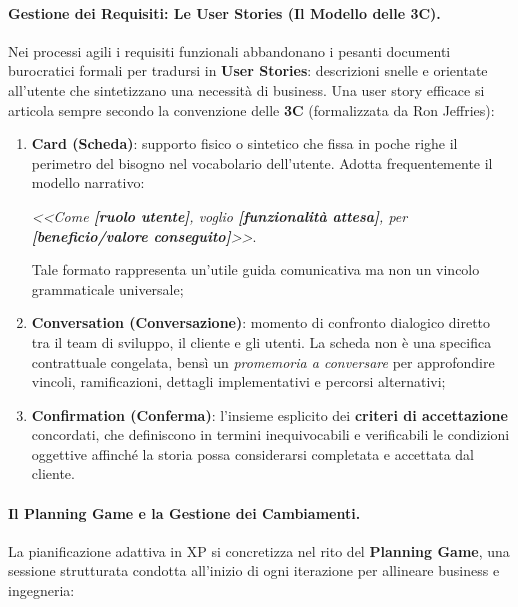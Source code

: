 \documentclass[12pt]{extarticle}
\begin{document}
\paragraph{Gestione dei Requisiti: Le User Stories (Il Modello delle 3C).}
Nei processi agili i requisiti funzionali abbandonano i pesanti documenti burocratici formali per tradursi in \textbf{User Stories}: descrizioni snelle e orientate all'utente che sintetizzano una necessità di business. Una user story efficace si articola sempre secondo la convenzione delle \textbf{3C} (formalizzata da Ron Jeffries):
\begin{enumerate}
    \item \textbf{Card (Scheda)}: supporto fisico o sintetico che fissa in poche righe il perimetro del bisogno nel vocabolario dell'utente. Adotta frequentemente il modello narrativo:\\
    \begin{center}
        \textit{<<Come \textbf{[ruolo utente]}, voglio \textbf{[funzionalità attesa]}, per \textbf{[beneficio/valore conseguito]}>>}.
    \end{center}
    Tale formato rappresenta un'utile guida comunicativa ma non un vincolo grammaticale universale;
    \item \textbf{Conversation (Conversazione)}: momento di confronto dialogico diretto tra il team di sviluppo, il cliente e gli utenti. La scheda non è una specifica contrattuale congelata, bensì un \textit{promemoria a conversare} per approfondire vincoli, ramificazioni, dettagli implementativi e percorsi alternativi;
    \item \textbf{Confirmation (Conferma)}: l'insieme esplicito dei \textbf{criteri di accettazione} concordati, che definiscono in termini inequivocabili e verificabili le condizioni oggettive affinché la storia possa considerarsi completata e accettata dal cliente.
\end{enumerate}

\paragraph{Il Planning Game e la Gestione dei Cambiamenti.}
La pianificazione adattiva in XP si concretizza nel rito del \textbf{Planning Game}, una sessione strutturata condotta all'inizio di ogni iterazione per allineare business e ingegneria:
\end{document}
